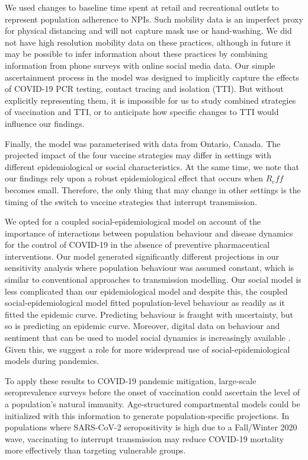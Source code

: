 We used changes to baseline time spent at retail and recreational outlets to represent population adherence to NPIs.  Such mobility data is an imperfect proxy for physical distancing and will not capture mask use or hand-washing.  We did not have high resolution mobility data on these practices, although in future it may be possible to infer information about these practices by combining information from phone surveys with online social media data. Our simple ascertainment process in the model was designed to implicitly capture the effects of COVID-19 PCR testing, contact tracing and isolation (TTI). But without explicitly representing them, it is impossible for us to study combined strategies of vaccination and TTI, or to anticipate how specific changes to TTI would influence our findings. 

Finally, the model was parameterised with data from Ontario, Canada. The projected impact of the four vaccine strategies may differ in settings with different epidemiological or social characteristics.  At the same time, we note that our findings rely upon a robust epidemiological effect that occurs when $R_eff$ becomes small. Therefore, the only thing that may change in other settings is the timing of the switch to vaccine strategies that interrupt transmission. 

We opted for a coupled social-epidemiological model on account of the importance of interactions between population behaviour and disease dynamics for the control of COVID-19 in the absence of preventive pharmaceutical interventions. Our model generated significantly different projections in our sensitivity analysis where population behaviour was assumed constant, which is similar to conventional approaches to transmission modelling. Our social model is less complicated than our epidemiological model and despite this, the coupled social-epidemiological model fitted population-level behaviour as readily as it fitted the epidemic curve. Predicting behaviour is fraught with uncertainty, but so is predicting an epidemic curve. Moreover, digital data on behaviour and sentiment that can be used to model social dynamics is increasingly available \cite{salathe2012digital}.  Given this, we suggest a role for more widespread use of  social-epidemiological models during pandemics. 

To apply these results to COVID-19 pandemic mitigation, large-scale seroprevalence surveys before the onset of vaccination could ascertain the level of a population's natural immunity.  Age-structured compartmental models could be initialized with this information to generate population-specific projections. In populations where SARS-CoV-2 seropositivity is high due to a Fall/Winter 2020 wave, vaccinating to interrupt transmission may reduce COVID-19 mortality more effectively than targeting vulnerable groups. 
